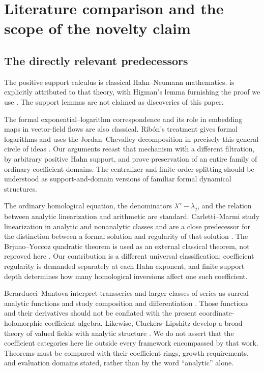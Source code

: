 \documentclass[11pt,letterpaper]{article}
\theoremstyle{definition}
\theoremstyle{remark}
\numberwithin{equation}{section}
\begin{document}
\section{Literature comparison and the scope of the novelty claim}
\label{sec:literature}

\subsection{The directly relevant predecessors}
The positive support calculus is classical Hahn--Neumann mathematics.
 is explicitly attributed to that theory, with Higman's
lemma furnishing the proof we use \cite{Higman,Poonen}. The support lemmas
are not claimed as discoveries of this paper.

The formal exponential--logarithm correspondence and its role in embedding
maps in vector-field flows are also classical. Rib\'on's treatment gives
formal logarithms and uses the Jordan--Chevalley decomposition in precisely
this general circle of ideas \cite{Ribon}. Our arguments recast that
mechanism with a different filtration, by arbitrary positive Hahn support,
and prove preservation of an entire family of ordinary coefficient domains.
The centralizer and finite-order splitting should be understood as
support-and-domain versions of familiar formal dynamical structures.

The ordinary homological equation, the denominators
$\lambda^\alpha-\lambda_j$, and the relation between analytic linearization
and arithmetic are standard. Carletti--Marmi study linearization in analytic
and nonanalytic classes and are a close predecessor for the distinction
between a formal solution and regularity of that solution
\cite{CarlettiMarmi}. The Brjuno--Yoccoz quadratic theorem is used as an
external classical theorem, not reproved here \cite{Yoccoz,BuffCheritat}.
Our contribution is a different universal classification: coefficient
regularity is demanded separately at each Hahn exponent, and finite
support depth determines how many homological inversions affect one such
coefficient.

Berarducci--Mantova interpret transseries and larger classes of series as
surreal analytic functions and study composition and differentiation
\cite{BM}. Those functions and their derivatives should not be conflated
with the present coordinate-holomorphic coefficient algebra. Likewise,
Cluckers--Lipshitz develop a broad theory of valued fields with analytic
structure \cite{CL}. We do not assert that the coefficient categories here
lie outside every framework encompassed by that work. Theorems must be
compared with their coefficient rings, growth requirements, and evaluation
domains stated, rather than by the word ``analytic'' alone.
\end{document}
